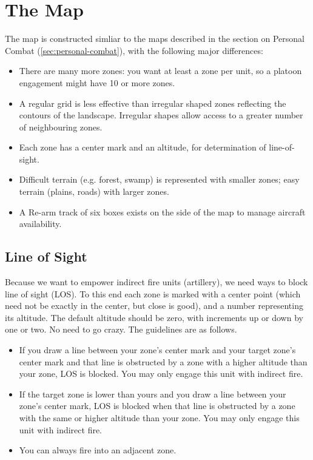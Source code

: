 \section{The Map}\label{sec:platoon-combat-map}

The map is constructed simliar to the maps described in the section on Personal Combat (\autoref{sec:personal-combat}), with the following major differences:

\begin{itemize}
\item
There are many more zones: you want at least a zone per unit, so a platoon engagement might have 10 or more zones.

\item
A regular grid is less effective than irregular shaped zones reflecting the contours of the landscape. Irregular shapes allow access to a greater number of neighbouring zones.

\item
Each zone has a center mark and an altitude, for determination of line-of-sight.

\item
Difficult terrain (e.g. forest, swamp) is represented with smaller zones; easy terrain (plains, roads) with larger zones.

\item
A Re-arm track of six boxes exists on the side of the map to manage aircraft availability.
\end{itemize}



\subsection{Line of Sight}\label{sec:line-of-sight}

Because we want to empower indirect fire units (artillery), we need ways to block line of sight (LOS). To this end each zone is marked with a center point (which need not be exactly in the center, but close is good), and a number representing its altitude. The default altitude should be zero, with increments up or down by one or two. No need to go crazy. The guidelines are as follows.

\begin{itemize}
\item
If you draw a line between your zone's center mark and your target zone's center mark and that line is obstructed by a zone with a higher altitude than your zone, LOS is blocked. You may only engage this unit with indirect fire.

\item
If the target zone is lower than yours and you draw a line between your zone's center mark, LOS is blocked when that line is obstructed by a zone with the same or higher altitude than your zone. You may only engage this unit with indirect fire.

\item
You can always fire into an adjacent zone.
\end{itemize}

